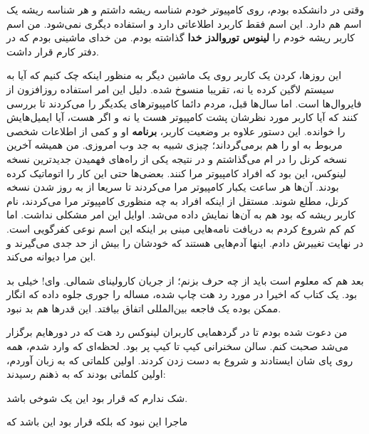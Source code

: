 وقتی در دانشکده بودم، روی کامپیوتر خودم شناسه ریشه داشتم و هر شناسه ریشه یک
اسم هم دارد. این اسم فقط کاربرد اطلاعاتی دارد و استفاده دیگری
نمی‌شود. من اسم کاربر ریشه خودم را \textbf{لینوس توروالدز
  خدا} گذاشته بودم. من خدای ماشینی بودم
که در دفتر کارم قرار داشت.

این روزها،  کردن یک کاربر روی یک ماشین دیگر به منظور اینکه
چک کنیم که آیا به سیستم لاگین کرده یا نه، تقریبا منسوخ شده. دلیل این
امر استفاده روزافزون از فایروال‌ها است. اما سال‌ها قبل، مردم دائما
کامپیوترهای یکدیگر را  می‌کردند تا بررسی کنند که آیا کاربر
مورد نظرشان پشت کامپیوتر هست یا نه و اگر هست، آیا ایمیل‌هایش را
خوانده. این دستور علاوه بر وضعیت کاربر،
\textbf{برنامه} او و کمی از اطلاعات شخصی مربوط به او
را هم برمی‌گرداند؛ چیزی شبیه به جد وب امروزی. من همیشه آخرین نسخه کرنل
را در ام می‌گذاشتم و در نتیجه یکی از راه‌های فهمیدن
جدیدترین نسخه لینوکس، این بود که افراد کامپیوتر مرا 
کنند. بعضی‌ها حتی این کار را اتوماتیک کرده بودند. آن‌ها هر ساعت یکبار
کامپیوتر مرا  می‌کردند تا سریعا از به روز شدن نسخه کرنل،
مطلع شوند. مستقل از اینکه افراد به چه منظوری کامپیوتر مرا 
می‌کردند، نام کاربر ریشه که  بود هم به آن‌ها
نمایش داده می‌شد. اوایل این امر مشکلی نداشت. اما کم کم شروع کردم به
دریافت نامه‌هایی مبنی بر اینکه این اسم نوعی کفرگویی است. در نهایت
تغییرش دادم. اینها آدم‌هایی هستند که خودشان را بیش از حد جدی می‌گیرند و
این مرا دیوانه می‌کند.

بعد هم که معلوم است باید از چه حرف بزنم؛ از جریان کارولینای
شمالی. وای! خیلی بد بود. یک کتاب که اخیرا در
مورد رد هت چاپ شده، مساله را جوری جلوه داده که انگار ممکن بوده یک
فاجعه بین‌المللی اتفاق بیافتد. این قدرها هم بد نبود.

من دعوت شده بودم تا در گردهمایی کاربران لینوکس رد هت که در دورهایم
برگزار می‌شد صحبت کنم. سالن سخنرانی کیپ تا کیپ پر بود. لحظه‌ای که وارد
شدم، همه روی پای شان ایستادند و شروع به دست زدن کردند. اولین کلماتی که
به زبان آوردم، اولین کلماتی بودند که به ذهنم رسیدند:


شک ندارم که قرار بود این یک شوخی باشد.

ماجرا این نبود که  بلکه قرار بود این باشد که

